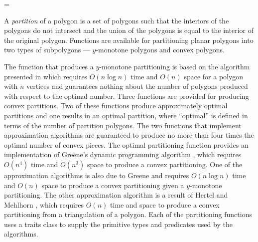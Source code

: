 

\label{chap:partition_2_ref}

\ccEnableRawListOfRefpages


\begin{ccTexOnly}
\ifnum\ccNewRefManualStyle=\ccTrue
\end{ccTexOnly}
A {\em partition} of a polygon is a set 
of polygons such that the interiors of the polygons do not intersect and 
the union of the polygons is equal to the interior of the original polygon.
Functions are available for partitioning planar polygons into two 
types of subpolygons --- $y$-monotone polygons and convex polygons.  

The function that produces a $y$-monotone partitioning is based on the 
algorithm presented in \cite{bkos-cgaa-97} which requires $O(n \log n)$ time 
and $O(n)$ space for a polygon with $n$ vertices and guarantees nothing 
about the number of polygons produced with respect to the optimal number.
Three functions are provided for producing
convex partitions. Two of these functions produce approximately optimal 
partitions and one results in an optimal partition, where ``optimal'' is
defined in terms of the number of partition polygons.   The two functions
that implement approximation algorithms are guaranteed to produce no more 
than four times the optimal number of convex pieces.  The optimal partitioning
function provides an implementation of Greene's dynamic programming algorithm
\cite{g-dpcp-83}, which requires $O(n^4)$ time and $O(n^3)$ space to produce a 
convex partitioning. One of the approximation algorithms is also due to 
Greene \cite{g-dpcp-83} and requires $O(n \log n)$ time and $O(n)$ space
to produce a convex partitioning given a $y$-monotone partitioning.  The
other approximation algorithm is a result of Hertel and
Mehlhorn \cite{hm-ftsp-83}, which requires $O(n)$ time and space to produce
a convex partitioning from a triangulation of a polygon.
Each of the partitioning functions uses a traits class to supply the
primitive types and predicates used by the algorithms.
\begin{ccTexOnly}
\fi
\end{ccTexOnly}



